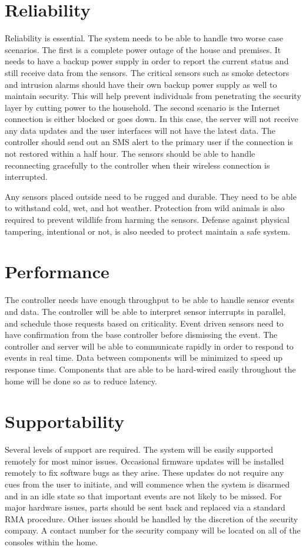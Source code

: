 \documentclass{report}
\begin{document}
\section{Reliability}
Reliability is essential. The system needs to be able to handle two worse case
scenarios. The first is a complete power outage of the house and premises. It
needs to have a backup power supply in order to report the current status and
still receive data from the sensors. The critical sensors such as smoke
detectors and intrusion alarms should have their own backup power supply as
well to maintain security. This will help prevent individuals from penetrating
the security layer by cutting power to the household. The second scenario is
the Internet connection is either blocked or goes down. In this case, the
server will not receive any data updates and the user interfaces will not have
the latest data. The controller should send out an SMS alert to the primary
user if the connection is not restored within a half hour. The sensors should
be able to handle reconnecting gracefully to the controller when their wireless
connection is interrupted.

Any sensors placed outside need to be rugged and durable. They need to be able
to withstand cold, wet, and hot weather. Protection from wild animals is also
required to prevent wildlife from harming the sensors. Defense against physical
tampering, intentional or not, is also needed to protect maintain a safe
system.

\section{Performance}
The controller needs have enough throughput to be able to handle sensor events
and data. The controller will be able to interpret sensor interrupts in parallel, and 
schedule those requests based on criticality. Event driven sensors need to have
confirmation from the base controller before dismissing the event. The
controller and server will be able to communicate rapidly in order to respond
to events in real time. Data between components will be minimized to speed up
response time. Components that are able to be hard-wired easily throughout the
home will be done so as to reduce latency.

\section{Supportability}
Several levels of support are required. The system will be easily supported
remotely for most minor issues. Occasional firmware updates will be installed
remotely to fix software bugs as they arise. These updates do not require any cues
from the user to initiate, and will commence when the system is disarmed and
in an idle state so that important events are not likely to be missed. For major hardware
issues, parts should be sent back and replaced via a standard RMA procedure. 
Other issues should be handled by the  discretion of the security company. A 
contact number for the security company will be located on all of the consoles 
within the home.
\end{document}
